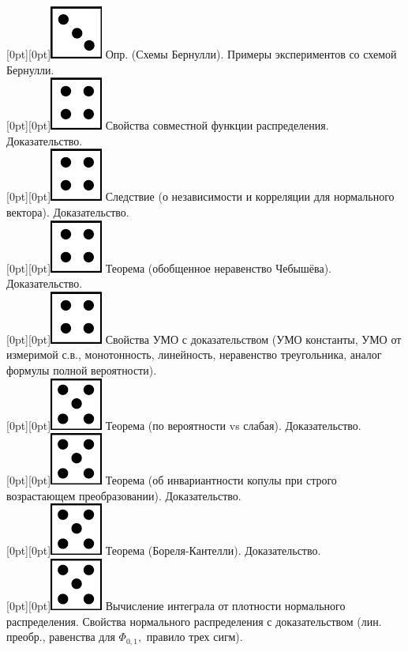 \documentclass[10pt]{article}
\begin{document}
\raisebox{-1pt}[0pt][0pt]{\includegraphics[width=0.02\linewidth]{3.png}} Опр. (Схемы Бернулли). Примеры экспериментов со схемой Бернулли. \\

\raisebox{-1pt}[0pt][0pt]{\includegraphics[width=0.02\linewidth]{4.png}} Свойства совместной функции распределения. Доказательство. \\

\raisebox{-1pt}[0pt][0pt]{\includegraphics[width=0.02\linewidth]{4.png}} Следствие (о независимости и корреляции для нормального вектора). Доказательство. \\ 

\raisebox{-1pt}[0pt][0pt]{\includegraphics[width=0.02\linewidth]{4.png}} Теорема (обобщенное неравенство Чебышёва). Доказательство. \\

\raisebox{-1pt}[0pt][0pt]{\includegraphics[width=0.02\linewidth]{4.png}} Свойства УМО с доказательством (УМО константы, УМО от измеримой с.в., монотонность,  линейность, неравенство треугольника,  аналог формулы полной вероятности). \\

\raisebox{-1pt}[0pt][0pt]{\includegraphics[width=0.02\linewidth]{5.png}} Теорема (по вероятности vs слабая). Доказательство. \\  

\raisebox{-1pt}[0pt][0pt]{\includegraphics[width=0.02\linewidth]{5.png}} Теорема (об инвариантности копулы при строго возрастающем преобразовании). Доказательство. \\

\raisebox{-1pt}[0pt][0pt]{\includegraphics[width=0.02\linewidth]{5.png}} Теорема (Бореля-Кантелли). Доказательство. \\

\raisebox{-1pt}[0pt][0pt]{\includegraphics[width=0.02\linewidth]{5.png}} Вычисление интеграла от плотности нормального распределения.  Свойства нормального распределения с доказательством (лин. преобр., равенства для $\Phi_{0,1},$ правило трех сигм). \\
\end{document}
